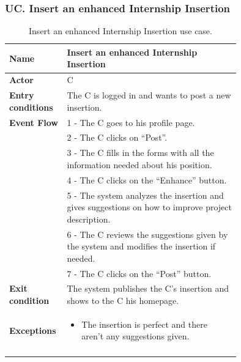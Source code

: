 \subsubsection*{UC\cuc . Insert an enhanced Internship Insertion}
\begin{center}
    \begin{longtable}{|l|p{0.75\linewidth}|}
        \hline
        \textbf{Name}               & Insert an enhanced Internship Insertion\\
        \hline
        \textbf{Actor}              & C\\
        \hline
        \textbf{Entry conditions}   & The C is logged in and wants to post a new insertion.\\
        \hline
        \textbf{Event Flow}         & 1 - The C goes to his profile page. \\
        & 2 - The C clicks on “Post”. \\
        & 3 - The C fills in the forms with all the information needed about his position. \\
        & 4 - The C clicks on the “Enhance” button. \\
        & 5 - The system analyzes the insertion and gives suggestions on how to improve project description. \\
        & 6 - The C reviews the suggestions given by the system and modifies the insertion if needed. \\
        & 7 - The C clicks on the “Post” button. \\
        \hline
        \textbf{Exit condition}   & The system publishes the C’s insertion and shows to the C his homepage. \\       
        \hline
        \textbf{Exceptions}       & \begin{itemize}
            \item The insertion is perfect and there aren’t any suggestions given.
        \end{itemize}\\
        \hline
        \caption{Insert an enhanced Internship Insertion use case.}
        \label{tab: enhanced_internship_insertion_use_case}
    \end{longtable}
\end{center}


